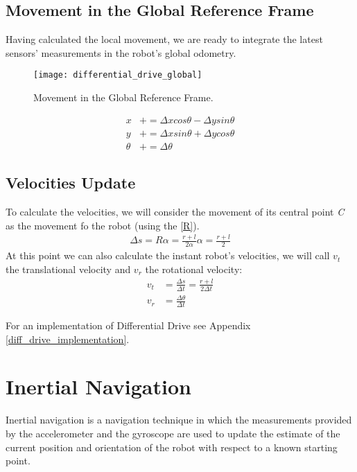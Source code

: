 \subsection{Movement in the Global Reference Frame}\label{from_local_to_global_mov}

Having calculated the local movement, we are ready to integrate the latest sensors' measurements in the robot's global odometry.
\begin{figure}[!ht]
	\texttt{[image: differential\_drive\_global]}
	\captionsetup{justification=centering, margin=1.5cm}
	\centering
	\caption{Movement in the Global Reference Frame.}
	\centering
\end{figure}

\begin{align}
	x &+= \Delta x cos \theta - \Delta y sin \theta\\
	y &+= \Delta x sin \theta + \Delta y cos \theta\\
	\theta &+= \Delta \theta
\end{align}

\subsection{Velocities Update}

To calculate the velocities, we will consider the movement of its central point \textit{C} as the movement fo the robot (using the \eqref{R}).
\begin{align}
	\Delta s = R \alpha = \frac{r + l}{2 \alpha} \alpha = \frac{r + l}{2}
\end{align}
At this point we can also calculate the instant robot's velocities, we will call $v_t$ the translational velocity and $v_r$ the rotational velocity:
\begin{align}
	v_t &= \frac{\Delta s}{\Delta t} = \frac{r + l}{2 \Delta t}\\[3mm]
	v_r &= \frac{\Delta \theta}{\Delta t}
\end{align}

For an implementation of Differential Drive see Appendix \ref{diff_drive_implementation}.

\section{Inertial Navigation}

Inertial navigation is a navigation technique in which the measurements provided by the accelerometer and the gyroscope are used to update the estimate of the current position and orientation of the robot with respect to a known starting point.\supercite{intro_inertial_navigation}


